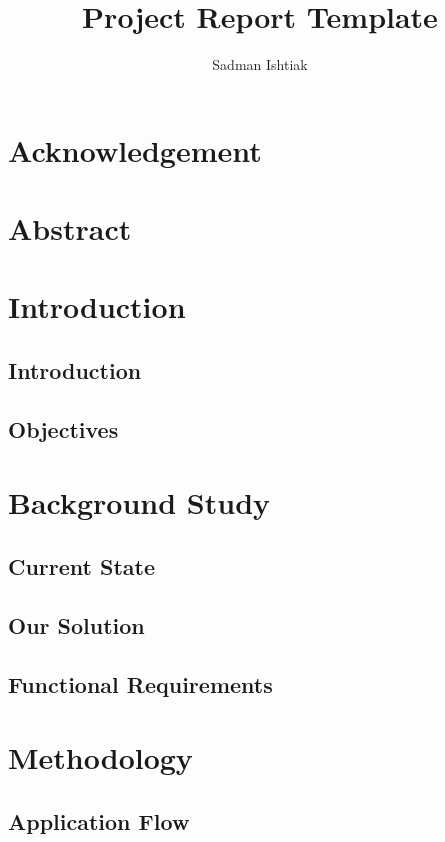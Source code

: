 \documentclass[a4paper, 12pt]{report}
\title{Project Report Template}
\author{Sadman Ishtiak}
\begin{document}
	\maketitle
	
	\setcounter{secnumdepth}{1}
	\setcounter{tocdepth}{1}
	\tableofcontents
	
	\clearpage
	
	\chapter*{Acknowledgement}
	
	\chapter*{Abstract}
	
	\chapter{Introduction}
	\section{Introduction}
	\section{Objectives}
	\chapter{Background Study}
	\section{Current State}
	\section{Our Solution}
	\section{Functional Requirements}
	\chapter{Methodology}
	\section{Application Flow}
\end{document}
